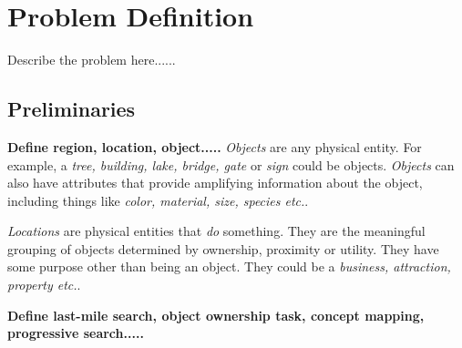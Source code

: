 \section{Problem Definition}
\label{section:problem}

Describe the problem here......

\subsection{Preliminaries}
\textbf{Define region, location, object.....}
\emph{Objects} are any physical entity. For example, a \textit{tree, building, lake, bridge, gate} or \textit{sign} could be objects. \textit{Objects} can also have attributes that provide amplifying information about the object, including things like \textit{color, material, size, species etc.}. 

\emph{Locations} are physical entities that \textit{do} something. They are the meaningful grouping of objects determined by ownership, proximity or utility. They have some purpose other than being an object. They could be a \textit{business, attraction, property etc.}. 

\textbf{Define last-mile search, object ownership task, concept mapping, progressive search.....}



